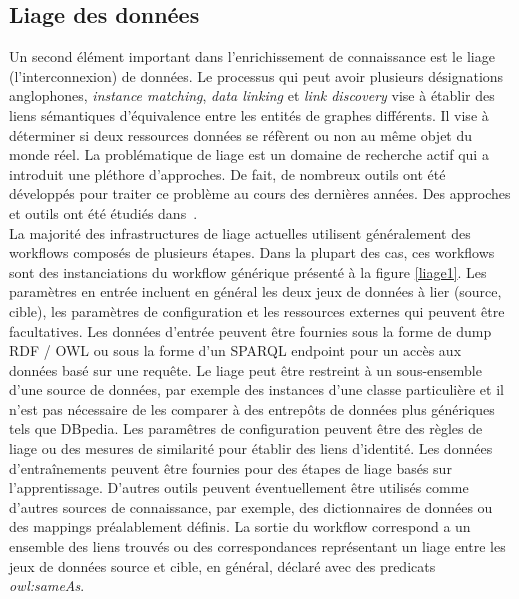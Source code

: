 \subsection{Liage des données}

Un second élément important dans l’enrichissement de connaissance est le liage (l’interconnexion) de données. Le processus qui peut avoir plusieurs désignations anglophones, \textit{instance matching}, \textit{data linking} et \textit{link discovery} vise à établir des liens sémantiques d’équivalence entre les entités de graphes différents. Il vise à déterminer si deux ressources données se réfèrent ou non au même objet du monde réel. La problématique de liage est un domaine de recherche actif qui a introduit une pléthore d'approches. De fait, de nombreux outils ont été développés pour traiter ce problème au cours des dernières années. Des approches et outils ont été étudiés dans~\cite{ferrara2011,Achichi2016,erv271}. \\
La majorité des infrastructures de liage actuelles utilisent généralement des workflows composés de plusieurs étapes. Dans la plupart des cas, ces workflows sont des instanciations du workflow générique présenté à la figure \ref{liage1}. Les paramètres en entrée incluent en général les deux jeux de données à lier (source, cible), les paramètres de configuration et les ressources externes qui peuvent être facultatives. Les données d'entrée peuvent être fournies sous la forme de dump RDF / OWL ou sous la forme d'un SPARQL endpoint pour un accès aux données basé sur une requête. Le liage peut être restreint à un sous-ensemble d'une source de données, par exemple des instances d'une classe particulière et il n'est pas nécessaire de les comparer à des entrepôts de données plus génériques tels que DBpedia. Les paramêtres de configuration peuvent être des règles de liage ou des mesures de similarité pour établir des liens d'identité. Les données d'entraînements peuvent être fournies pour des étapes de liage basés sur l'apprentissage. D'autres outils peuvent éventuellement être utilisés comme d'autres sources de connaissance, par exemple, des dictionnaires de données ou des mappings préalablement définis. La sortie du workflow correspond a un ensemble des liens trouvés ou des correspondances représentant un liage entre les jeux de données source et cible, en général, déclaré avec des predicats \textit{owl:sameAs}.


